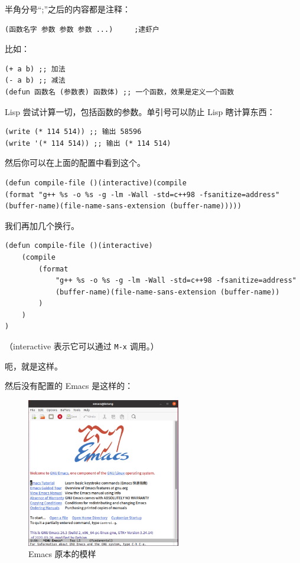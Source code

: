 \documentclass[UTF-8]{ctexart}
\begin{document}
				半角分号“;”之后的内容都是注释：
				
				\begin{verbatim}
(函数名字 参数 参数 参数 ...)     ;逮虾户
				\end{verbatim}
			
				比如：
				
				\begin{verbatim}
(+ a b) ;; 加法
(- a b) ;; 减法
(defun 函数名 (参数表) 函数体) ;; 一个函数，效果是定义一个函数
				\end{verbatim}
			
				Lisp 尝试计算一切，包括函数的参数。单引号可以防止 Lisp 瞎计算东西：
				
				\begin{verbatim}
(write (* 114 514)) ;; 输出 58596
(write '(* 114 514)) ;; 输出 (* 114 514)
				\end{verbatim}
				
				然后你可以在上面的配置中看到这个。
				
				\begin{verbatim}
(defun compile-file ()(interactive)(compile 
(format "g++ %s -o %s -g -lm -Wall -std=c++98 -fsanitize=address" 
(buffer-name)(file-name-sans-extension (buffer-name)))))
				\end{verbatim}
			
				我们再加几个换行。
				
				\begin{verbatim}
(defun compile-file ()(interactive)
    (compile 
        (format
            "g++ %s -o %s -g -lm -Wall -std=c++98 -fsanitize=address" 
            (buffer-name)(file-name-sans-extension (buffer-name))
        )
    )
)
				\end{verbatim}
			
				（interactive 表示它可以通过 \texttt{M-x} 调用。）
				
				呃，就是这样。
				
				然后没有配置的 Emacs 是这样的：
				
				\begin{figure}[H]
					\centering
					\includegraphics[width=0.6\textwidth]{fig/emacs_orig.png}
					\caption*{Emacs 原本的模样}
				\end{figure}
				
\end{document}
